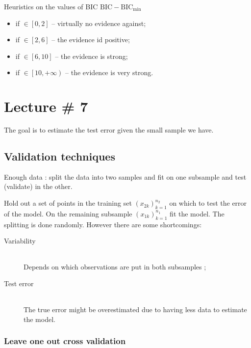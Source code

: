 \documentclass[a4paper]{article}
\newcommand{\clo}[1]{{\left [ #1 \right ]}}
\newcommand{\clop}[1]{{\left [ #1 \right )}}
\newcommand{\brac}[1]{{\left ( #1 \right )}}
\begin{document}
Heuristics on the values of BIC $\text{BIC}-\text{BIC}_{\min}$
\begin{itemize}
	\item if $\in\clo{0,2}$ -- virtually no evidence against;
	\item if $\in\clo{2,6}$ -- the evidence id positive;
	\item if $\in\clo{6,10}$ -- the evidence is strong;
	\item if $\in\clop{10, +\infty}$ -- the evidence is very strong.
\end{itemize}




\clearpage
\section{Lecture \# 7} %
\label{sec:lecture_7}

The goal is to estimate the test error given the small sample we have.

\subsection{Validation techniques} %
\label{sub:validation_techniques}

Enough data : split the data into two samples and fit on one subsample and test (validate) in the other.

Hold out a set of points in the training set $\brac{x_{2k}}_{k=1}^{n_2}$ on which to test the error of the model.
On the remaining subsample $\brac{x_{1k}}_{k=1}^{n_1}$ fit the model. The splitting is done randomly.
However there are some shortcomings:
\begin{description}
	\item[Variability] \hfill\\
		Depends on which observations are put in both subsamples ;
	\item[Test error] \hfill\\
		The true error might be overestimated due to having less data to estimate the model.
\end{description}

\subsubsection{Leave one out cross validation} %
\label{ssub:leave_one_out_cross_validation}
\end{document}
